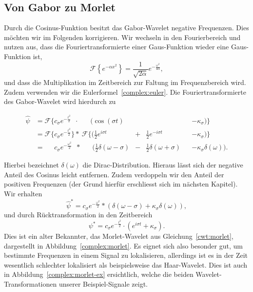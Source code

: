 \subsection{Von Gabor zu Morlet}
\label{complex:gabor-to-morlet}
Durch die Cosinus-Funktion besitzt das Gabor-Wavelet negative Frequenzen.
Dies möchten wir im Folgenden korrigieren.
Wir wechseln in den Fourierbereich und nutzen aus, dass die Fouriertransformierte einer Gaus-Funktion wieder eine Gaus-Funktion ist,
\[
	\mathcal{F}\left\lbrace e^{-\alpha x^2} \right\rbrace 
	= \frac{1}{\sqrt{2\alpha}}e^{- \frac{\omega^2}{4\alpha}},
\]
und dass die Multiplikation im Zeitbereich zur Faltung im Frequenzbereich wird.
Zudem verwenden wir die Eulerformel~\eqref{complex:euler}.
Die Fouriertransformierte des Gabor-Wavelet wird hierdurch zu

\begin{equation*}
\begin{aligned}
 \hat{\psi}
 & = \mathcal{F}\Bigg\lbrace c_\sigma e^{-\frac{t^2}{2}}\phantom{\Bigg\rbrace}
 \cdot\; \phantom{\mathcal{F}\Bigg\lbrace}
 \Bigg(\cos\left(\sigma t\right) &&
 &&- \kappa_\sigma\Bigg) \Bigg\rbrace \\
 & = \mathcal{F}\Bigg\lbrace c_\sigma e^{-\frac{t^2}{2}} \Bigg\rbrace 
 *\: \mathcal{F}\Bigg\lbrace\Bigg( \frac12 e^{i\sigma t} &+& \frac12 e^{-i\sigma t}
 &&- \kappa_\sigma \Bigg)\Bigg\rbrace\\
 & = \phantom{\mathcal{F}\Bigg\lbrace} c_\sigma e^{- \frac{\omega^2}{2}} \phantom{\Big\rbrace}
 *\:\phantom{\mathcal{F}\Bigg\lbrace} \Bigg(
  \frac{1}{2}\delta(\omega - \sigma) &-&
  \frac{1}{2}\delta(\omega + \sigma) 
 && - \kappa_\sigma\delta(\omega)
  \Bigg).
\end{aligned}
\end{equation*}

Hierbei bezeichnet $\delta(\omega)$ die Dirac-Distribution.
Hieraus lässt sich der negative Anteil des Cosinus leicht entfernen.
Zudem verdoppeln wir den Anteil der positiven Frequenzen (der Grund hierfür erschliesst sich im nächsten Kapitel).
Wir erhalten
\[
	\hat{\psi}^\ast = 
	c_\sigma e^{- \frac{\omega^2}{2}} * \left(
	\delta(\omega - \sigma) +
	\kappa_\sigma\delta(\omega)
	\right),
\]
und durch Rücktransformation in den Zeitbereich
\[
	\psi^\ast = 
	c_\sigma e^{- \frac{t^2}{2}} \cdot \left(
	e^{i\sigma t} +
	\kappa_\sigma
	\right).
\]
Dies ist ein alter Bekannter, das Morlet-Wavelet aus Gleichung~\eqref{cwt:morlet}, dargestellt in Abbildung~\ref{complex:morlet}.
Es eignet sich also besonder gut, um bestimmte Frequenzen in einem Signal zu lokalisieren, allerdings ist es in der Zeit wesentlich schlechter lokalisiert als beispielsweise das Haar-Wavelet.
Dies ist auch in Abbildung~\ref{complex:morlet-ex} ersichtlich, welche die beiden Wavelet-Transformationen unserer Beispiel-Signale zeigt.

